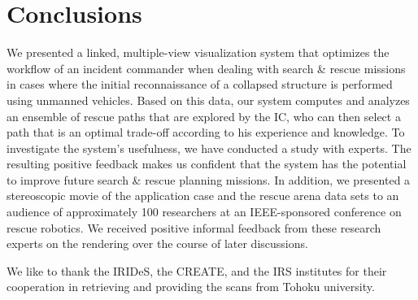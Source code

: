\documentclass[conference,10pt,letter]{IEEEtran}
\def\IC{IC}
\begin{document}

\section{Conclusions} \label{sec:conclusion}
We presented a linked, multiple-view visualization system that optimizes the workflow of an incident commander when dealing with search \& rescue missions in cases where the initial reconnaissance of a collapsed structure is performed using unmanned vehicles. Based on this data, our system computes and analyzes an ensemble of rescue paths that are explored by the \IC , who can then select a path that is an optimal trade-off according to his experience and knowledge. To investigate the system's usefulness, we have conducted a study with experts. The resulting positive feedback makes us confident that the system has the potential to improve future search \& rescue planning missions. In addition, we presented a stereoscopic movie of the application case and the rescue arena data sets to an audience of approximately 100 researchers at an IEEE-sponsored conference on rescue robotics. We received positive informal feedback from these research experts on the rendering over the course of later discussions.

We like to thank the IRIDeS, the CREATE, and the IRS institutes for their cooperation in retrieving and providing the scans from Tohoku university.




%
%



\end{document}
